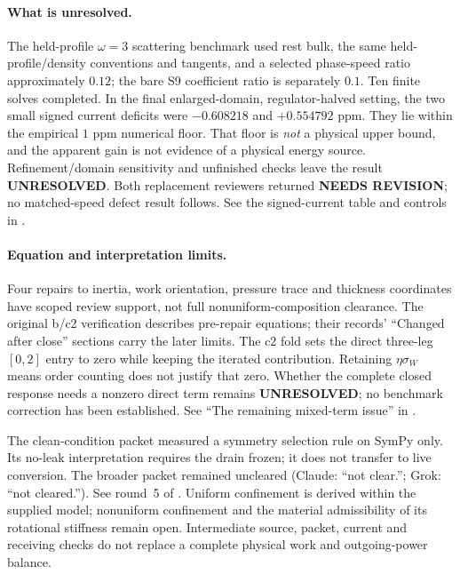 \paragraph{What is unresolved.}
The held-profile \(\omega=3\) scattering benchmark used rest bulk, the same
held-profile/density conventions and tangents, and a selected phase-speed
ratio approximately \(0.12\); the bare S9 coefficient ratio is separately
\(0.1\). Ten finite solves completed. In the final enlarged-domain,
regulator-halved setting, the two small signed current deficits were
\(-0.608218\) and \(+0.554792\) ppm. They lie within the empirical
\(1\) ppm numerical floor. That floor is \emph{not} a physical upper bound,
and the apparent gain is not evidence of a physical energy source.
Refinement/domain sensitivity and unfinished checks leave the result
\textbf{UNRESOLVED}. Both replacement reviewers returned
\textbf{NEEDS REVISION}; no matched-speed defect result follows. See the
signed-current table and controls in
.

\paragraph{Equation and interpretation limits.}
Four repairs to inertia, work orientation, pressure trace and thickness
coordinates have scoped review support, not full nonuniform-composition
clearance. The original b/c2 verification describes pre-repair equations;
their records' ``Changed after close'' sections carry the later limits.
The c2 fold sets the direct three-leg \([0,2]\) entry to zero while keeping
the iterated contribution. Retaining \(\eta\sigma_W\) means order counting
does not justify that zero. Whether the complete closed response needs a
nonzero direct term remains \textbf{UNRESOLVED}; no benchmark correction
has been established. See ``The remaining mixed-term issue'' in
.

The clean-condition packet measured a symmetry selection rule on SymPy
only. Its no-leak interpretation requires the drain frozen; it does not
transfer to live conversion. The broader packet remained uncleared
(Claude: ``not clear.''; Grok: ``not cleared.''). See round~5 of
.
Uniform confinement is derived within the supplied model; nonuniform
confinement and the material admissibility of its rotational stiffness
remain open. Intermediate source, packet, current and receiving checks do
not replace a complete physical work and outgoing-power balance.

